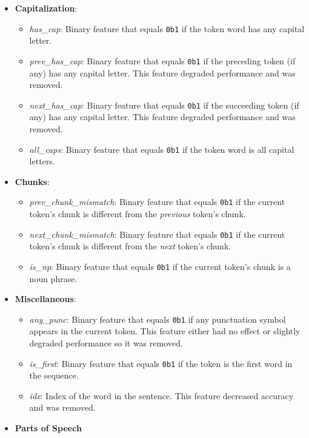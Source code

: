 \documentclass{article}
\begin{document}
  \begin{itemize}
    \item \textbf{Capitalization}:
      \begin{itemize}
        \item \textit{has\_cap}: Binary feature that equals \texttt{0b1} if the token word has any capital letter.
        \item \textit{prev\_has\_cap}: Binary feature that equals \texttt{0b1} if the preceding token (if any) has any capital letter. This feature degraded performance and was removed.
        \item \textit{next\_has\_cap}: Binary feature that equals \texttt{0b1} if the succeeding token (if any) has any capital letter. This feature degraded performance and was removed.
        \item \textit{all\_caps}: Binary feature that equals \texttt{0b1} if the token word is all capital letters.
      \end{itemize}
    \item \textbf{Chunks}:
      \begin{itemize}
        \item \textit{prev\_chunk\_mismatch}: Binary feature that equals \texttt{0b1} if the current token's chunk is different from the \textit{previous} token's chunk.
        \item \textit{next\_chunk\_mismatch}: Binary feature that equals \texttt{0b1} if the current token's chunk is different from the \textit{next} token's chunk.
        \item \textit{is\_np}: Binary feature that equals \texttt{0b1} if the current token's chunk is a noun phrase.
      \end{itemize}
    \item \textbf{Miscellaneous}:
      \begin{itemize}
        \item \textit{any\_punc}: Binary feature that equals \texttt{0b1} if any punctuation symbol appears in the current token.  This feature either had no effect or slightly degraded performance so it was removed.
        \item \textit{is\_first}: Binary feature that equals \texttt{0b1} if the token is the first word in the sequence.
        \item \textit{idx}: Index of the word in the sentence.  This feature decreased accuracy and was removed.
      \end{itemize}
    \item \textbf{Parts of Speech}

\end{itemize}
\end{document}
